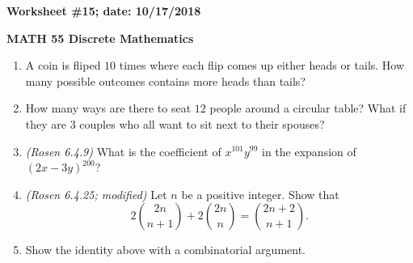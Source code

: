 \documentclass{article}
\begin{document}
{\bf Worksheet \#15; date: 10/17/2018}

{\bf MATH 55 Discrete Mathematics}

\begin{enumerate}
\item A coin is fliped $10$ times where each flip comes up either heads or tails. How many possible outcomes contains more heads than tails?

\item How many ways are there to seat $12$ people around a circular table? What if they are $3$ couples who all want to sit next to their spouses?

\item {\em (Rosen 6.4.9)} What is the coefficient of $x^{101} y^{99}$ in the expansion of $(2x - 3y)^{200}$?

\item {\em (Rosen 6.4.25; modified)} Let $n$ be a positive integer. Show that
\[
2 \binom{2n}{n+1} + 2 \binom{2n}{n} = \binom{2n+2}{n+1}.
\]

\item Show the identity above with a combinatorial argument.
\end{enumerate}
\end{document}
